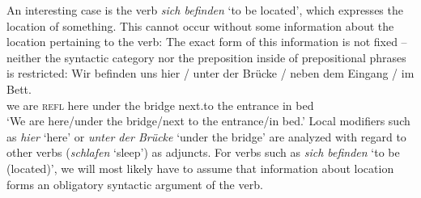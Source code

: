 {%
An interesting case is the verb \emph{sich befinden} `to be located', which expresses the location of something. This cannot occur without
some information about the location pertaining to the verb:
\z
The exact form of this information is not fixed -- neither the syntactic category nor the
preposition inside of prepositional phrases is restricted:
\ea
\gll Wir befinden uns hier / unter der Brücke / neben dem Eingang / im Bett.\\
	 we are \textsc{refl} here {} under the bridge {} next.to the entrance {} in bed\\
\glt `We are here/under the bridge/next to the entrance/in bed.'
\z
Local modifiers such as \emph{hier} `here' or \emph{unter der Brücke} `under the bridge' are analyzed with regard to
other verbs (\eg \emph{schlafen} `sleep') as adjuncts. For verbs such as \emph{sich befinden} `to be (located)', we will most likely
have to assume that information about location forms an obligatory syntactic argument of the verb.
%
%
}
